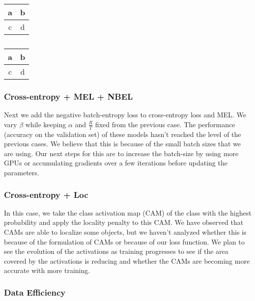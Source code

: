 \begin{table}
	\centering
	\begin{subtable}{0.15\textwidth}
	\centering
	\begin{tabular}{|c|c|}
		\hline
		a & b \\
		\hline
		c & d\\
		\hline
	\end{tabular}
	\caption{}
	\label{tab:cifar_mel_ratio}
	\end{subtable}
	\begin{subtable}{0.15\textwidth}
	\centering
	\begin{tabular}{|c|c|}
		\hline
		a & b \\
		\hline
		c & d\\
		\hline
	\end{tabular}
	\caption{}
	\label{tab:cifar_mel_unsup}
	\end{subtable}
\end{table}

\subsubsection{Cross-entropy + MEL + NBEL}
Next we add the negative batch-entropy loss to cross-entropy loss and MEL. We vary $\beta$ while
keeping $\alpha$ and $\frac{R}{T}$ fixed from the previous case. The performance (accuracy on the
validation set) of these models hasn't reached the level of the previous cases. We
believe that this is because of the small batch sizes that we are using. Our next steps for this are
to increase the batch-size by using more GPUs or accumulating gradients over a few iterations before
updating the parameters.

\subsubsection{Cross-entropy + Loc}
In this case, we take the class activation map (CAM) of the class with the highest probability and
apply the locality penalty to this CAM. We have observed that CAMs
are able to localize some objects, but we haven't analyzed whether this is because of the
formulation of CAMs or because of our loss function. We plan to see the evolution of the
activations as training progresses to see if the area covered by the activations is reducing and
whether the CAMs are becoming more accurate with more training. 

\subsubsection{Data Efficiency}





